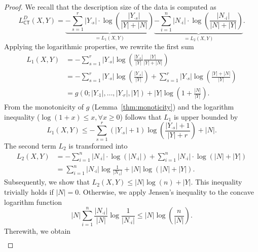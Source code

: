 \begin{proof}
We recall that the description size of the data is computed as
\[L_{\mathsf{CT}}^D(X,Y)=\underbrace{-\sum_{s=1}^r \lvert Y_{\cdot s}\rvert  \cdot \log\left(\frac{\lvert Y_{\cdot s}\rvert }{\lvert Y\rvert +\lvert N\rvert }\right)}_{=L_1(X,Y)}
       \underbrace{-\sum_{i=1}^n \lvert N_{\cdot i}\rvert  \cdot \log\left(\frac{\lvert N_{\cdot i}\rvert }{\lvert N\rvert +\lvert Y\rvert }\right)}_{=L_2(X,Y)}.
\]
Applying the logarithmic properties, we rewrite the first sum 
\begin{align*}
 L_1(X,Y)&= -\sum_{s=1}^r\lvert Y_{\cdot s}\rvert \log\left(\frac{\lvert Y_{\cdot s}\rvert }{\lvert Y\rvert }\frac{\lvert Y\rvert }{\lvert Y\rvert +\lvert N\rvert }\right)\\
 &= -\sum_{s=1}^r\lvert Y_{\cdot s}\rvert \log\left(\frac{\lvert Y_{\cdot s}\rvert }{\lvert Y\rvert }\right)+\sum_{s=1}^r\lvert Y_{\cdot s}\rvert \log\left(\frac{\lvert Y\rvert +\lvert N\rvert }{\lvert Y\rvert }\right)\\
 &= g(0;\lvert Y_{\cdot 1}\rvert ,\ldots,\lvert Y_{\cdot r}\rvert ,\lvert Y\rvert ) +\lvert Y\rvert \log\left(1+\frac{\lvert N\rvert }{\lvert Y\rvert }\right). %
\end{align*}
From the monotonicity of $g$ (Lemma~\ref{thm:monoticity}) and the logarithm inequality ($\log(1+x)\leq x, \forall x\geq 0$) follows that $L_1$ is upper bounded by
\[L_1(X,Y)\leq-\sum_{s=1}^r(\lvert Y_{\cdot s}\rvert +1)\log\left(\frac{\lvert Y_{\cdot s}\rvert +1}{\lvert Y\rvert +r}\right)+\lvert N\rvert .\]
The second term $L_2$ is transformed into
\begin{align*}
    L_2(X,Y)&=-\sum_{i=1}^n \lvert N_{\cdot i}\rvert  \cdot \log\left(\lvert N_{\cdot i}\rvert \right)+\sum_{i=1}^n \lvert N_{\cdot i}\rvert  \cdot \log\left(\lvert N\rvert +\lvert Y\rvert \right)\\
    &= \sum_{i=1}^n\lvert N_{\cdot i}\rvert \log\frac{1}{\lvert N_{\cdot i}\rvert } +\lvert N\rvert \log(\lvert N\rvert +\lvert Y\rvert ).
\end{align*}
Subsequently, we show that $L_2(X,Y)\leq \lvert N\rvert \log(n) +\lvert Y\rvert $. This inequality trivially holds if $\lvert N\rvert =0$. Otherwise, we apply Jensen's inequality to the concave logarithm function
	\[\lvert N\rvert \sum_{i=1}^n\frac{\lvert N_{\cdot i}\rvert }{\lvert N\rvert }\log\frac{1}{\lvert N_{\cdot i}\rvert }\leq \lvert N\rvert \log\left(\frac{n}{\lvert N\rvert }\right).\]
Therewith, we obtain 
\begin{align*}

\end{align*}
\end{proof}

